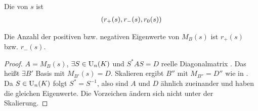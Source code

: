 \begin{definition}[Signatur]
	Die  von $s$ ist 
	\begin{align}
		(r_+(s),r_-(s),r_0(s))\notag
	\end{align}
\end{definition}

\begin{conclusion}
	Die Anzahl der positiven bzw. negativen Eigenwerte von $M_B(s)$ ist $r_+(s)$ bzw. $r_-(s)$.
\end{conclusion}
\begin{proof}
	$A=M_B(s)$, $\exists S\in\operatorname{U}_n(K)$ und $S^*AS=D$ reelle Diagonalmatrix . Das heißt $\exists B'$ Basis mit $M_{B'}(s)=D$. Skalieren ergibt $B''$ mit $M_{B''}=D''$ wie in . Da $S\in\operatorname{U}_n(K)$ folgt $S^*=S^{-1}$, also sind $A$ und $D$ ähnlich zueinander und haben die gleichen Eigenwerte. Die Vorzeichen ändern sich nicht unter der Skalierung.
\end{proof}